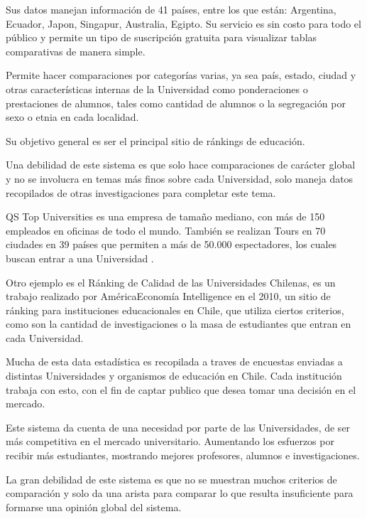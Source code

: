 \documentclass[a4paper,12pt,openany,oneside]{book}
\begin{document}
Sus datos manejan información de 41 países, entre los que están: Argentina, Ecuador, Japon, Singapur, Australia, Egipto. Su servicio es sin costo para todo el público y permite un tipo de suscripción gratuita para visualizar tablas comparativas de manera simple.

Permite hacer comparaciones por categorías varias, ya sea país, estado, ciudad y otras características internas de la Universidad como ponderaciones o prestaciones de alumnos, tales como cantidad de alumnos o la segregación por sexo o etnia en cada localidad.

Su objetivo general es ser el principal sitio de ránkings de educación.

Una debilidad de este sistema es que solo hace comparaciones de carácter global y no se involucra en temas más finos sobre cada Universidad, solo maneja datos recopilados de otras investigaciones para completar este tema.

QS Top Universities es una empresa de tamaño mediano, con más de 150 empleados en oficinas de todo el mundo. También se realizan Tours en 70 ciudades en 39 países que permiten a más de 50.000 espectadores, los cuales buscan entrar a una Universidad  \cite{data2}.

Otro ejemplo es el Ránking de Calidad de las Universidades Chilenas, es un trabajo realizado por AméricaEconomía Intelligence en el 2010, un sitio de ránking para instituciones educacionales en Chile, que utiliza ciertos criterios, como son la cantidad de investigaciones o la masa de estudiantes que entran en cada Universidad.


Mucha de esta data estadística es recopilada a traves de encuestas enviadas a distintas Universidades y organismos de educación en Chile. Cada institución trabaja con esto, con el fin de captar publico que desea tomar una decisión en el mercado.

Este sistema da cuenta de una necesidad por parte de las Universidades, de ser más competitiva en el mercado universitario. Aumentando los esfuerzos por recibir más estudiantes, mostrando mejores profesores, alumnos e investigaciones.

La gran debilidad de este sistema es que no se muestran muchos criterios de comparación y solo da una arista para comparar lo que resulta insuficiente para formarse una opinión global del sistema.
\end{document}
